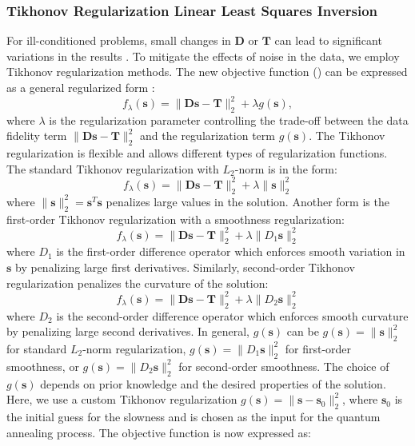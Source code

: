 \subsubsection{Tikhonov Regularization Linear Least Squares Inversion}

For ill-conditioned problems, small changes in \(\mathbf{D}\) or \(\mathbf{T}\) can lead to significant variations in the results \cite{Deif1986}. To mitigate the effects of noise in the data, we employ Tikhonov regularization methods. The new objective function () can be expressed as a general regularized form \cite{fierro1997}:
\begin{equation}
f_\lambda(\mathbf{s}) = \| \mathbf{D} \mathbf{s} - \mathbf{T} \|_2^2 + \lambda g(\mathbf{s}),
\end{equation}
where \(\lambda\) is the regularization parameter controlling the trade-off between the data fidelity term \(\| \mathbf{D} \mathbf{s} - \mathbf{T} \|_2^2\) and the regularization term \(g(\mathbf{s})\). The Tikhonov regularization is flexible and allows different types of regularization functions. The standard Tikhonov regularization with \( L_2 \)-norm is in the form:
\begin{equation}
f_\lambda(\mathbf{s}) = \| \mathbf{D} \mathbf{s} - \mathbf{T} \|_2^2 + \lambda \|\mathbf{s}\|_2^2
\end{equation}
where \( \|\mathbf{s}\|_2^2 = \mathbf{s}^T \mathbf{s} \) penalizes large values in the solution. Another form is the first-order Tikhonov regularization with a smoothness regularization:
\begin{equation}
f_\lambda(\mathbf{s}) = \| \mathbf{D} \mathbf{s} - \mathbf{T} \|_2^2 + \lambda \| D_1 \mathbf{s} \|_2^2
\end{equation}
where \( D_1 \) is the first-order difference operator which enforces smooth variation in \( \mathbf{s} \) by penalizing large first derivatives. Similarly, second-order Tikhonov regularization penalizes the curvature of the solution:
\begin{equation}
f_\lambda(\mathbf{s}) = \| \mathbf{D} \mathbf{s} - \mathbf{T} \|_2^2 + \lambda \| D_2 \mathbf{s} \|_2^2
\end{equation}
where \( D_2 \) is the second-order difference operator which enforces smooth curvature by penalizing large second derivatives.
In general, \( g(\mathbf{s}) \) can be \( g(\mathbf{s}) = \|\mathbf{s}\|_2^2 \) for standard \( L_2 \)-norm regularization, \( g(\mathbf{s}) = \|D_1 \mathbf{s} \|_2^2 \) for first-order smoothness, or \( g(\mathbf{s}) = \|D_2 \mathbf{s} \|_2^2 \) for second-order smoothness. The choice of \( g(\mathbf{s}) \) depends on prior knowledge and the desired properties of the solution. Here, we use a custom Tikhonov regularization \(g(\mathbf{s}) = \| \mathbf{s} - \mathbf{s}_0 \|_2^2\), where \(\mathbf{s}_0\) is the initial guess for the slowness and is chosen as the input for the quantum annealing process. The objective function is now expressed as:
